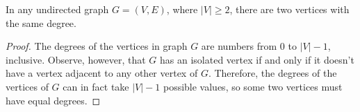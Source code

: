 \subproblem
\begin{theorem}
    In any undirected graph $G=(V,E)$, where $|V|\ge2$, there are two vertices with the same degree.
\end{theorem}

\begin{proof}
    The degrees of the vertices in graph $G$ are numbers from 0 to $|V|-1$, inclusive.
    Observe, however, that $G$ has an isolated vertex if and only if it doesn't have a vertex adjacent to any other vertex of $G$.
    Therefore, the degrees of the vertices of $G$ can in fact take $|V|-1$ possible values, so some two vertices must have equal degrees.
\end{proof}
